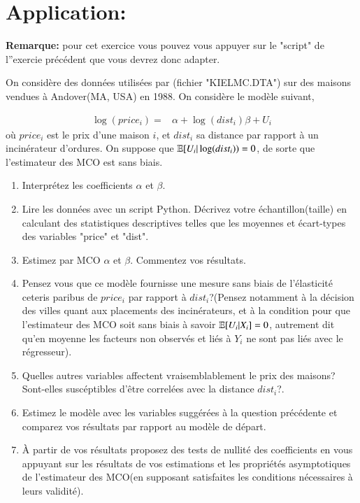 \section{Application: \cite{KielMcCain1995}}
\textbf{Remarque:} pour cet exercice vous pouvez vous appuyer sur le "script" de l''exercie précédent que vous devrez donc adapter.

\medskip

On considère des données utilisées par \cite{KielMcCain1995}(fichier "KIELMC.DTA") sur des maisons vendues à Andover(MA, USA) en 1988. On considère le modèle suivant,

\begin{align*}
\log(price_i) =& \alpha + \log(dist_i)\beta + U_i
\end{align*}
où $price_i$ est le prix d'une maison $i$, et $dist_i$ sa distance par rapport à un incinérateur d'ordures. On suppose que $\mathbb{E}[U_i| \log(dist_i)) = 0$, de sorte que l'estimateur des MCO est sans biais.

 \begin{enumerate}
 \item Interprétez les coefficients $\alpha$ et $\beta$. 
\item Lire les données avec un script Python. Décrivez votre
  échantillon(taille) en calculant des statistiques descriptives
  telles que les moyennes et
  écart-types des variables "price" et "dist".
 \item Estimez par MCO $\alpha$ et $\beta$. Commentez vos résultats.
 \item Pensez vous que ce modèle fournisse une mesure sans biais de l'élasticité ceteris paribus de $price_i$ par rapport à $dist_i$?(Pensez  notamment à la décision des villes quant aux placements des incinérateurs, et à la condition pour que l'estimateur des MCO soit sans biais à savoir $\mathbb{E}[U_i|X_i] = 0$, autrement dit qu'en moyenne les facteurs non observés et liés à $Y_i$ ne sont pas liés avec le régresseur).
 \item Quelles autres variables affectent vraisemblablement le prix des
   maisons? Sont-elles suscéptibles d'être correlées avec la distance
   $dist_i$?.
  \item Estimez le modèle avec les variables suggérées à la question précédente et comparez vos résultats 
  par rapport au modèle de départ. 
  \item À partir de vos résultats proposez des tests de nullité des coefficients en vous appuyant sur 
  les résultats de vos estimations et les propriétés asymptotiques de l'estimateur des MCO(en supposant 
  satisfaites les conditions nécessaires à leurs validité).
 \end{enumerate}



 